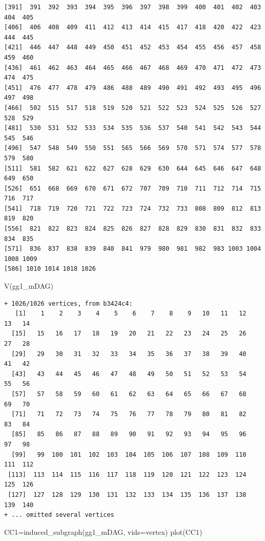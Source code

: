 \documentclass[
  letterpaper,
  DIV=11,
  numbers=noendperiod]{scrreprt}
\newenvironment{Shaded}{\begin{snugshade}}{\end{snugshade}}
\newcommand{\AttributeTok}[1]{\textcolor[rgb]{0.40,0.45,0.13}{#1}}
\newcommand{\FunctionTok}[1]{\textcolor[rgb]{0.28,0.35,0.67}{#1}}
\newcommand{\NormalTok}[1]{\textcolor[rgb]{0.00,0.23,0.31}{#1}}
\newcommand{\OtherTok}[1]{\textcolor[rgb]{0.00,0.23,0.31}{#1}}
\begin{document}
\begin{verbatim}
[391]  391  392  393  394  395  396  397  398  399  400  401  402  403  404  405
[406]  406  408  409  411  412  413  414  415  417  418  420  422  423  444  445
[421]  446  447  448  449  450  451  452  453  454  455  456  457  458  459  460
[436]  461  462  463  464  465  466  467  468  469  470  471  472  473  474  475
[451]  476  477  478  479  486  488  489  490  491  492  493  495  496  497  498
[466]  502  515  517  518  519  520  521  522  523  524  525  526  527  528  529
[481]  530  531  532  533  534  535  536  537  540  541  542  543  544  545  546
[496]  547  548  549  550  551  565  566  569  570  571  574  577  578  579  580
[511]  581  582  621  622  627  628  629  630  644  645  646  647  648  649  650
[526]  651  668  669  670  671  672  707  709  710  711  712  714  715  716  717
[541]  718  719  720  721  722  723  724  732  733  808  809  812  813  819  820
[556]  821  822  823  824  825  826  827  828  829  830  831  832  833  834  835
[571]  836  837  838  839  840  841  979  980  981  982  983 1003 1004 1008 1009
[586] 1010 1014 1018 1026
\end{verbatim}

\begin{Shaded}
\begin{Highlighting}[]
\FunctionTok{V}\NormalTok{(gg1\_mDAG)}
\end{Highlighting}
\end{Shaded}

\begin{verbatim}
+ 1026/1026 vertices, from b3424c4:
   [1]    1    2    3    4    5    6    7    8    9   10   11   12   13   14
  [15]   15   16   17   18   19   20   21   22   23   24   25   26   27   28
  [29]   29   30   31   32   33   34   35   36   37   38   39   40   41   42
  [43]   43   44   45   46   47   48   49   50   51   52   53   54   55   56
  [57]   57   58   59   60   61   62   63   64   65   66   67   68   69   70
  [71]   71   72   73   74   75   76   77   78   79   80   81   82   83   84
  [85]   85   86   87   88   89   90   91   92   93   94   95   96   97   98
  [99]   99  100  101  102  103  104  105  106  107  108  109  110  111  112
 [113]  113  114  115  116  117  118  119  120  121  122  123  124  125  126
 [127]  127  128  129  130  131  132  133  134  135  136  137  138  139  140
+ ... omitted several vertices
\end{verbatim}

\begin{Shaded}
\begin{Highlighting}[]
\NormalTok{CC1}\OtherTok{=}\FunctionTok{induced\_subgraph}\NormalTok{(gg1\_mDAG, }\AttributeTok{vids=}\NormalTok{vertex)}
\FunctionTok{plot}\NormalTok{(CC1)}
\end{Highlighting}
\end{Shaded}
\end{document}
